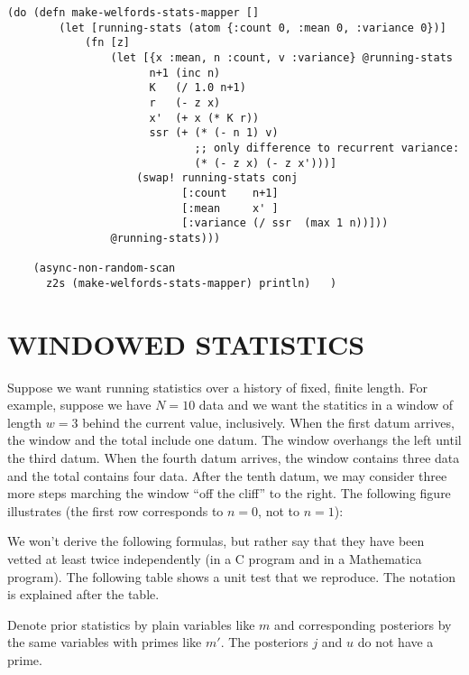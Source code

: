 \documentclass[10pt,oneside,x11names]{article}
\begin{document}
\begin{verbatim}
(do (defn make-welfords-stats-mapper []
        (let [running-stats (atom {:count 0, :mean 0, :variance 0})]
            (fn [z]
                (let [{x :mean, n :count, v :variance} @running-stats
                      n+1 (inc n)
                      K   (/ 1.0 n+1)
                      r   (- z x)
                      x'  (+ x (* K r))
                      ssr (+ (* (- n 1) v)
                             ;; only difference to recurrent variance:
                             (* (- z x) (- z x')))]
                    (swap! running-stats conj
                           [:count    n+1]
                           [:mean     x' ]
                           [:variance (/ ssr  (max 1 n))]))
                @running-stats)))

    (async-non-random-scan
      z2s (make-welfords-stats-mapper) println)   )
\end{verbatim}

\section{WINDOWED STATISTICS}
\label{windowed-statistics}
Suppose we want running statistics over a history of fixed, finite
length. For example, suppose we have \(N=10\) data and we want the
statitics in a window of length \(w=3\) behind the current value,
inclusively. When the first datum arrives, the window and the total
include one datum. The window overhangs the left until the third datum.
When the fourth datum arrives, the window contains three data and the
total contains four data. After the tenth datum, we may consider three
more steps marching the window ``off the cliff'' to the right. The
following figure illustrates (the first row corresponds to \(n=0\), not to
\(n=1\)):

We won't derive the following formulas, but rather say that they have
been vetted at least twice independently (in a C program and in a
Mathematica program). The following table shows a unit test that we
reproduce. The notation is explained after the table.

Denote prior statistics by plain variables like \(m\) and corresponding
posteriors by the same variables with primes like \(m'\). The posteriors
\(j\) and \(u\) do not have a prime.
\end{document}
